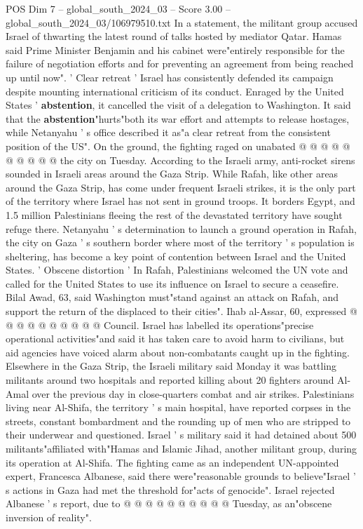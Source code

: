 \begin{textsample}{POS Dim 7 – global\_south\_2024\_03 – Score 3.00 – global\_south\_2024\_03/106979510.txt}
In a statement, the militant group accused Israel of thwarting the latest round of talks hosted by mediator Qatar.
Hamas said Prime Minister Benjamin and his cabinet were"entirely responsible for the failure of negotiation efforts and for preventing an agreement from being reached up until now". ' Clear retreat ' Israel has consistently defended its campaign despite mounting international criticism of its conduct.
Enraged by the United States ' \textbf{abstention}, it cancelled the visit of a delegation to Washington.
It said that the \textbf{abstention}"hurts"both its war effort and attempts to release hostages, while Netanyahu ' s office described it as"a clear retreat from the consistent position of the US".
On the ground, the fighting raged on unabated @ @ @ @ @ @ @ @ @ @ the city on Tuesday.
According to the Israeli army, anti-rocket sirens sounded in Israeli areas around the Gaza Strip.
While Rafah, like other areas around the Gaza Strip, has come under frequent Israeli strikes, it is the only part of the territory where Israel has not sent in ground troops.
It borders Egypt, and 1.5 million Palestinians fleeing the rest of the devastated territory have sought refuge there.
Netanyahu ' s determination to launch a ground operation in Rafah, the city on Gaza ' s southern border where most of the territory ' s population is sheltering, has become a key point of contention between Israel and the United States. ' Obscene distortion ' In Rafah, Palestinians welcomed the UN vote and called for the United States to use its influence on Israel to secure a ceasefire.
Bilal Awad, 63, said Washington must"stand against an attack on Rafah, and support the return of the displaced to their cities".
Ihab al-Assar, 60, expressed @ @ @ @ @ @ @ @ @ @ Council.
Israel has labelled its operations"precise operational activities"and said it has taken care to avoid harm to civilians, but aid agencies have voiced alarm about non-combatants caught up in the fighting.
Elsewhere in the Gaza Strip, the Israeli military said Monday it was battling militants around two hospitals and reported killing about 20 fighters around Al-Amal over the previous day in close-quarters combat and air strikes.
Palestinians living near Al-Shifa, the territory ' s main hospital, have reported corpses in the streets, constant bombardment and the rounding up of men who are stripped to their underwear and questioned.
Israel ' s military said it had detained about 500 militants"affiliated with"Hamas and Islamic Jihad, another militant group, during its operation at Al-Shifa.
The fighting came as an independent UN-appointed expert, Francesca Albanese, said there were"reasonable grounds to believe"Israel ' s actions in Gaza had met the threshold for"acts of genocide".
Israel rejected Albanese ' s report, due to @ @ @ @ @ @ @ @ @ @ Tuesday, as an"obscene inversion of reality".

\end{textsample}
